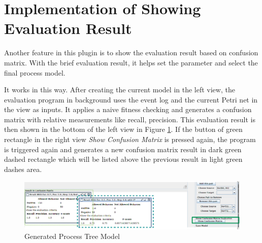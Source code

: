 \section{Implementation of Showing Evaluation Result}
Another feature in this plugin  is to show the evaluation result based on confusion matrix. With the brief evaluation result, it helps set the parameter and select the final process model. 

It works in this way. After creating the current model in the left view, the evaluation program in background uses the event log and the current Petri net in the view as inputs. It applies a naive fitness checking and generates a confusion matrix with relative measurements like recall, precision. This evaluation result is then shown in the bottom of the left view in Figure \ref{fig:dfg-IM-cm}.  If the button of green rectangle in the right view \emph{Show Confusion Matrix} is pressed again, the program is triggered again and generates a new  confusion matrix result in  dark green dashed rectangle which will be listed above the previous result in light green dashes area. 
\begin{figure}
	\centering
	\includegraphics[width=\textwidth]{figures/implementation/dfg-IM-confusionmatrix.png}
	\caption{Generated Process Tree Model}
	\label{fig:dfg-IM-cm}
\end{figure}

